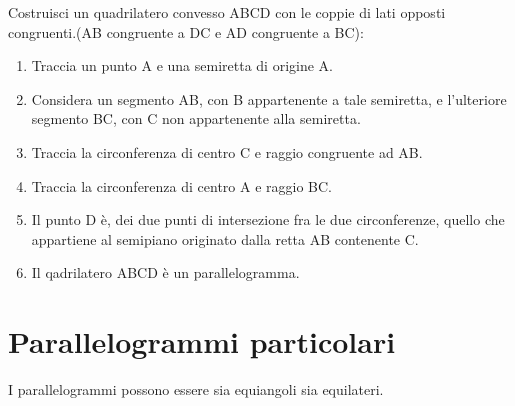 \begin{procedura}
  Costruisci un quadrilatero convesso ABCD con le coppie di lati opposti 
congruenti.(AB congruente a DC e AD congruente a BC):
  \begin{enumerate} [nosep]
    \item 
    Traccia un punto A e una semiretta di origine A.
    \item 
    Considera un segmento AB, con B appartenente a tale semiretta, e 
l'ulteriore segmento BC, con C non appartenente alla semiretta.
    \item 
    Traccia la circonferenza di centro C e raggio congruente ad AB.
    \item 
    Traccia la circonferenza di centro A e raggio BC.
    
    \item
    Il punto D è, dei due punti di intersezione fra le due circonferenze, 
quello che appartiene al semipiano originato dalla retta AB contenente C.
    \item 
    Il qadrilatero ABCD è un parallelogramma.
\end{enumerate}
\end{procedura}

\newpage %

\section{Parallelogrammi particolari}
  \label{sect:parallelogrammi_particolari}

I parallelogrammi possono essere sia equiangoli sia equilateri.

